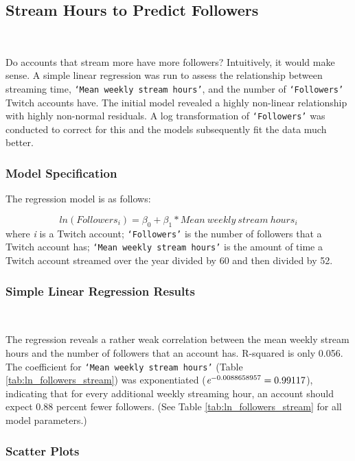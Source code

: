 \documentclass[12pt]{article}
\begin{document}
\subsection{Stream Hours to Predict Followers}\

Do accounts that stream more have more followers? Intuitively, it would make sense. A simple linear regression was run to assess the relationship between streaming time, \texttt{`Mean weekly stream hours'}, and the number of \texttt{`Followers'} Twitch accounts have. The initial model revealed a highly non-linear relationship with highly non-normal residuals. A log transformation of \texttt{`Followers'} was conducted to correct for this and the models subsequently fit the data much better.

\subsubsection{Model Specification}
The regression model is as follows:

\begin{equation}
	ln(Followers_{i}) = \beta_{0} + \beta_{1} \ast Mean\ weekly\ stream\ hours_{i}
	\label{eq:ln_followers_stream}
\end{equation}
where \emph{i} is a Twitch account; \texttt{`Followers'} is the number of followers that a Twitch account has; \texttt{`Mean weekly stream hours'} is the amount of time a Twitch account streamed over the year divided by 60 and then divided by 52.

\subsubsection{Simple Linear Regression Results}\

The regression reveals a rather weak correlation between the mean weekly stream hours and the number of followers that an account has. R-squared is only 0.056. The coefficient for \texttt{`Mean weekly stream hours'} (Table \ref{tab:ln_followers_stream}) was exponentiated ($\emph{e}^{-0.0088658957} = 0.99117$), indicating that for every additional weekly streaming hour, an account should expect 0.88 percent fewer followers. (See Table \ref{tab:ln_followers_stream} for all model parameters.)

\subsubsection{Scatter Plots}
\end{document}

